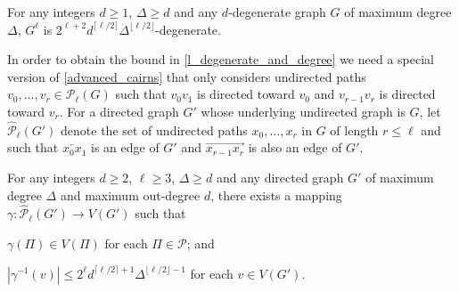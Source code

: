 \documentclass{patmorin}
\begin{document}
\begin{cor}\label{degeneracy_of_g_l}
  For any integers $d\ge 1$, $\Delta\ge d$ and any $d$-degenerate graph $G$ of maximum degree $\Delta$, $G^{\ell}$ is $2^{\ell+2}d^{\lceil \ell/2\rceil}\Delta^{\lfloor\ell/2\rfloor}$-degenerate.
\end{cor}

In order to obtain the bound in \cref{l_degenerate_and_degree} we need a special version of \cref{advanced_cairns} that only considers undirected paths $v_0,\ldots,v_r\in \mathcal{P}_\ell(G)$ such that $v_0v_1$ is directed toward $v_0$ and $v_{r-1}v_r$ is directed toward $v_r$.  For a directed graph $G'$ whose underlying undirected graph is $G$, let $\widehat{\mathcal{P}}_\ell(G')$ denote the set of undirected paths $x_0,\ldots,x_r$ in $G$ of length $r\le\ell$ and such that $\overleftarrow{x_0x_1}$ is an edge of $G'$ and $\overrightarrow{x_{r-1}x_{r}}$ is also an edge of $G'$.

\begin{lem}\label{advanced_cairns2}
  For any integers $d\ge 2$, $\ell\ge 3$, $\Delta\ge d$ and any
  directed graph $G'$ of maximum degree $\Delta$ and maximum out-degree $d$, there exists a mapping $\gamma:\widehat{\mathcal{P}}_\ell(G')\to V(G')$ such that
  \begin{compactenum}[(i)]
    \item $\gamma(\Pi)\in V(\Pi)$ for each $\Pi\in\mathcal{P}$; and
    \item $|\gamma^{-1}(v)| \le 2^{\ell}d^{\lceil \ell/2\rceil+1}\Delta^{\lfloor\ell/2\rfloor-1}$ for each $v\in V(G')$.
  \end{compactenum}
\end{lem}
\end{document}
